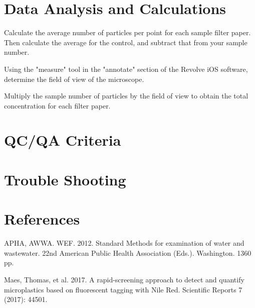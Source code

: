 \documentclass[12pt]{../SOP4_alpha}\usepackage[]{graphicx}\usepackage[]{color}
\begin{document}
\section{Data Analysis and Calculations}

  \NP Calculate the average number of particles per point for each sample filter paper. Then calculate the average for the control, and subtract that from your sample number.

  \NP Using the "measure" tool in the "annotate" section of the Revolve iOS software, determine the field of view of the microscope.

  \NP Multiply the sample number of particles by the field of view to obtain the total concentration for each filter paper.
  


\section{QC/QA Criteria}

\section{Trouble Shooting}

\section{References}

\NP APHA, AWWA. WEF. 2012. Standard Methods for examination of water and wastewater. 22nd American Public Health Association (Eds.). Washington. 1360 pp.

\NP Maes, Thomas, et al. 2017. A rapid-screening approach to detect and quantify microplastics based on fluorescent tagging with Nile Red. Scientific Reports 7 (2017): 44501.
\end{document}

